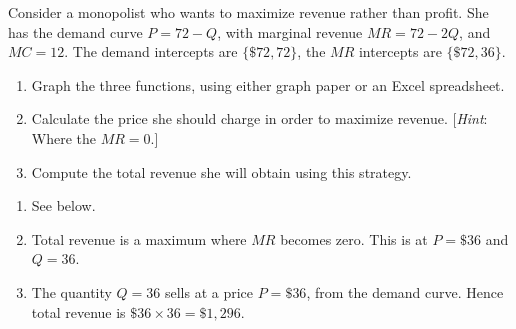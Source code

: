 \begin{enumialphparenastyle}
\begin{econex}\label{ex:ch10ex2}
Consider a monopolist who wants to maximize revenue rather than profit. She has the demand curve $P=72-Q$, with marginal revenue $MR=72-2Q$, and $MC=12$. The demand intercepts are $\{\$72,72\}$, the $MR$ intercepts are $\{\$72,36\}$.
\begin{enumerate}
\item	Graph the three functions, using either graph paper or an Excel spreadsheet.
\item	Calculate the price she should charge in order to maximize revenue. [\textit{Hint}: Where the $MR=0$.]
\item	Compute the total revenue she will obtain using this strategy.
\end{enumerate}
\begin{econsolution}
\begin{enumerate}
\item	See below.
\item	Total revenue is a maximum where $MR$ becomes zero. This is at $P=\$36$ and $Q=36$.
\item	The quantity $Q=36$ sells at a price $P=\$36$, from the demand curve. Hence total revenue is $\$36\times 36=\$1,296$.
\end{enumerate}
\begin{center*}
\end{center*}
\end{econsolution}
\end{econex}


\end{enumialphparenastyle}

